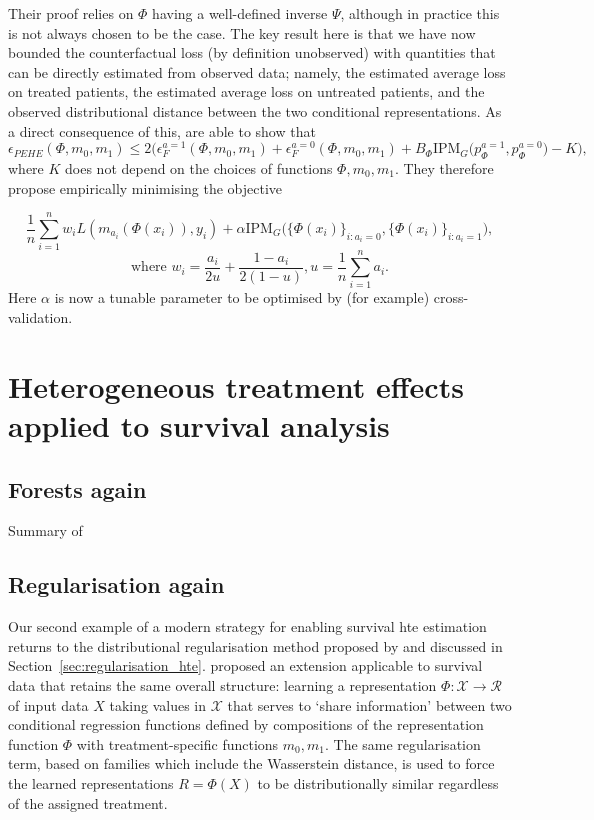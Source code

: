 \documentclass[../thesis.tex]{subfiles}
\begin{document}
Their proof relies on $\Phi$ having a well-defined inverse $\Psi$, although in practice this is not always chosen to be the case. The key result here is that we have now bounded the counterfactual loss (by definition unobserved) with quantities that can be directly estimated from observed data; namely, the estimated average loss on treated patients, the estimated average loss on untreated patients, and the observed distributional distance between the two conditional representations. As a direct consequence of this, \citet{shalit_estimating_2017} are able to show that 
\[ \epsilon_{PEHE}(\Phi, m_0, m_1) \leq 2\Big(\epsilon_{F}^{a=1}(\Phi, m_0, m_1) + \epsilon^{a=0}_F(\Phi, m_0, m_1) + B_{\Phi}\mathrm{IPM}_G\big(p_\Phi^{a=1}, p_\Phi^{a=0}\big) - K\Big),\]
where $K$ does not depend on the choices of functions $\Phi, m_0, m_1$. They therefore propose empirically minimising the objective

\[\frac{1}{n}\sum_{i=1}^n w_i L(m_{a_i}(\Phi(x_i)), y_i) + \alpha \mathrm{IPM}_G\big(\{\Phi(x_i)\}_{i:a_i=0}, \{\Phi(x_i)\}_{i:a_i=1}\big),\]
\[ \text{where } w_i = \frac{a_i}{2u} + \frac{1-a_i}{2(1-u)}, u = \frac{1}{n}\sum_{i=1}^{n}a_i.\]
Here $\alpha$ is now a tunable parameter to be optimised by (for example) cross-validation.


\section{Heterogeneous treatment effects applied to survival analysis \label{sec:hte_survival}}

\subsection{Forests again \label{sec:surv_hte_forests}}
{\color{red} Summary of \citet{cui_estimating_2022}}

\subsection{Regularisation again \label{sec:surv_reg}}
Our second example of a modern strategy for enabling survival \gls{hte} estimation returns to the distributional regularisation method proposed by \citet{shalit_estimating_2017} and discussed in Section~\ref{sec:regularisation_hte}. \citet{chapfuwa_enabling_2021} proposed an extension applicable to survival data that retains the same overall structure: learning a representation $\Phi \colon \mathcal{X} \rightarrow \mathcal{R}$ of input data $X$ taking values in $\mathcal{X}$ that serves to `share information' between two conditional regression functions defined by compositions of the representation function $\Phi$ with treatment-specific functions $m_0,m_1$. The same regularisation term, based on  families which include the Wasserstein distance, is used to force the learned representations $R=\Phi(X)$ to be distributionally similar regardless of the assigned treatment. 
\end{document}
